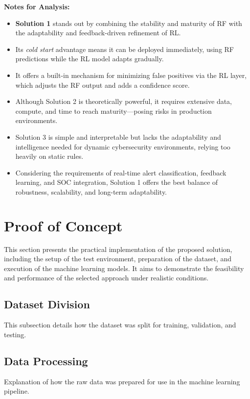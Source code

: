 \normalsize

\textbf{Notes for Analysis:}
\begin{itemize}
    \item \textbf{Solution 1} stands out by combining the stability and maturity of \gls{RF} with the adaptability and feedback-driven refinement of \gls{RL}.
    \item Its \textit{cold start} advantage means it can be deployed immediately, using \gls{RF} predictions while the \gls{RL} model adapts gradually.
    \item It offers a built-in mechanism for minimizing false positives via the \gls{RL} layer, which adjusts the \gls{RF} output and adds a confidence score.
    \item Although Solution 2 is theoretically powerful, it requires extensive data, compute, and time to reach maturity—posing risks in production environments.
    \item Solution 3 is simple and interpretable but lacks the adaptability and intelligence needed for dynamic cybersecurity environments, relying too heavily on static rules.
    \item Considering the requirements of real-time alert classification, feedback learning, and SOC integration, Solution 1 offers the best balance of robustness, scalability, and long-term adaptability.
\end{itemize}


\section{Proof of Concept}
This section presents the practical implementation of the proposed solution, including the setup of the test environment, preparation of the dataset, and execution of the machine learning models. It aims to demonstrate the feasibility and performance of the selected approach under realistic conditions.

\subsection{Dataset Division}
This subsection details how the dataset was split for training, validation, and testing.

\subsection{Data Processing}
Explanation of how the raw data was prepared for use in the machine learning pipeline.

